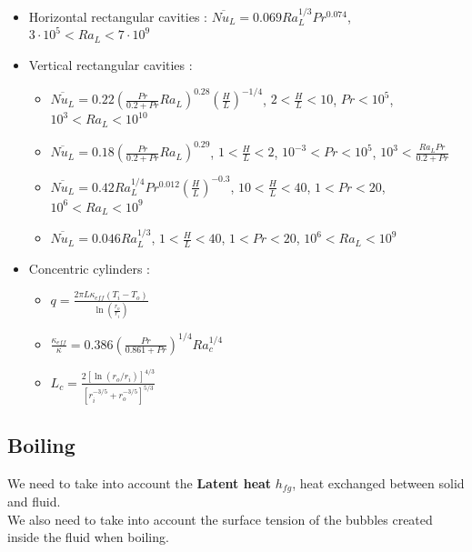 \documentclass[../main.tex]{subfiles}
\begin{document}
\begin{itemize}
    \item Horizontal rectangular cavities : $\overline{Nu_L} = 0.069 Ra_L^{1/3} Pr^{0.074}$, $3\cdot 10^5 < Ra_L < 7\cdot 10^9$\\
    \item Vertical rectangular cavities : \begin{itemize}
        \item $\overline{Nu_L} = 0.22(\frac{Pr}{0.2+Pr} Ra_L)^{0.28} (\frac{H}{L})^{-1/4}$, $2<\frac{H}{L}<10$, $Pr<10^5$, $10^3 < Ra_L < 10^{10}$\\
        \item $\overline{Nu_L} = 0.18(\frac{Pr}{0.2+Pr} Ra_L)^{0.29}$, $1<\frac{H}{L}<2$, $10^{-3} < Pr<10^5$, $10^3 < \frac{Ra_L Pr}{0.2+Pr}$\\
        \item $\overline{Nu_L} = 0.42 Ra_L^{1/4} Pr^{0.012} (\frac{H}{L})^{-0.3}$, $10<\frac{H}{L}<40$, $1<Pr<20$, $10^6 < Ra_L < 10^9$\\
        \item $\overline{Nu_L} = 0.046 Ra_L^{1/3}$, $1<\frac{H}{L}<40$, $1<Pr<20$, $10^6 < Ra_L < 10^9$\\
    \end{itemize}
    \item Concentric cylinders : \begin{itemize}
        \item $q = \frac{2\pi L \kappa_{eff} (T_i-T_o)}{\ln(\frac{r_o}{r_i})}$\\
        \item $\frac{\kappa_{eff}}{\kappa}= 0.386 (\frac{Pr}{0.861 + Pr})^{1/4} Ra_c^{1/4}$\\
        \item $L_c = \frac{2[\ln(r_o/r_i)]^{4/3}}{[r_i^{-3/5} + r_o^{-3/5}]^{5/3}}$\\
    \end{itemize} 
\end{itemize}

\subsection{Boiling}
We need to take into account the \textbf{Latent heat} $h_{fg}$, heat exchanged between solid and fluid.\\

We also need to take into account the surface tension of the bubbles created inside the fluid when boiling.\\
\end{document}
